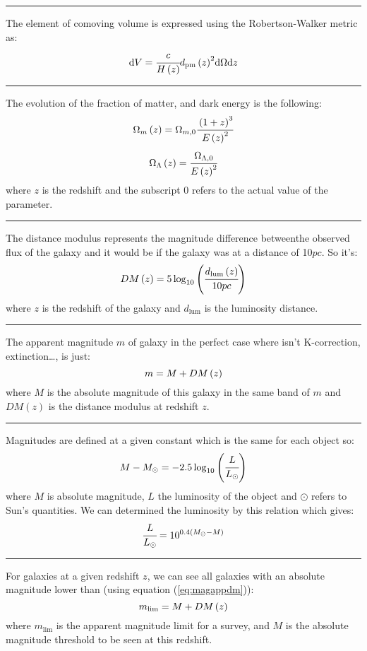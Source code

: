 \noindent\rule{\linewidth}{1pt}
The element of comoving volume is expressed using the Robertson-Walker metric as:
\begin{equation}
	{\rm{d}}{V}=\cfrac{c}{H\left({z}\right)}{d_{\mathrm{pm}}\left({z}\right)}^2{\rm{d}}{\Omega}{\rm{d}}{z}
\end{equation}

\noindent\rule{\linewidth}{1pt}
The evolution of the fraction of matter, and dark energy is the following:
\begin{equation}
	\Omega_m\left({z}\right)=\Omega_{m,0}\cfrac{\left(1+z\right)^3}{E\left({z}\right)^2}
\end{equation}
\begin{equation}
	\Omega_\Lambda\left({z}\right)=\cfrac{\Omega_{\Lambda,0}}{E\left({z}\right)^2}
\end{equation}
where $z$ is the redshift and the subscript 0 refers to the actual value of the parameter.

\noindent\rule{\linewidth}{1pt}
The distance modulus represents the magnitude difference betweenthe observed flux of the galaxy and it would be if the galaxy was at
a distance of 10$pc$. So it's:
\begin{equation}
	DM\pg{z}\pd=5\log_{10}\pg\cfrac{d_{\mathrm{lum}}\pg{z}\pd}{10pc}\pd%
\end{equation}
where $z$ is the redshift of the galaxy and $d_{\mathrm{lum}}$ is the luminosity distance.

\noindent\rule{\linewidth}{1pt}
The apparent magnitude $m$ of galaxy in the perfect case where isn't K-correction, extinction\ldots, is just:
\begin{equation}\label{eq:magappdm}
	m=M+DM\pg{z}\pd%
\end{equation}
where $M$ is the absolute magnitude of this galaxy in the same band of $m$ and $DM(z)$ is the distance modulus at redshift $z$.

\noindent\rule{\linewidth}{1pt}
Magnitudes are defined at a given constant which is the same for each object so:
\begin{equation}
	M-M_\odot=-2.5\log_{10}\pg\cfrac{L}{L_\odot}\pd%
\end{equation}
where $M$ is absolute magnitude, $L$ the luminosity of the object and $\odot$ refers to Sun's quantities.
We can determined the luminosity by this relation which gives:
\begin{equation}
	\cfrac{L}{L_\odot}=10^{0.4\left({M_\odot-M}\right)}
\end{equation}

\noindent\rule{\linewidth}{1pt}
For galaxies at a given redshift $z$, we can see all galaxies with an absolute magnitude
lower than (using equation (\ref{eq:magappdm})):
\begin{equation}
	m_{\mathrm{lim}}=M+DM\pg{z}\pd%
\end{equation}
where $m_{\mathrm{\lim}}$ is the apparent magnitude limit for a survey, and $M$ is the
absolute magnitude threshold to be seen at this redshift.

